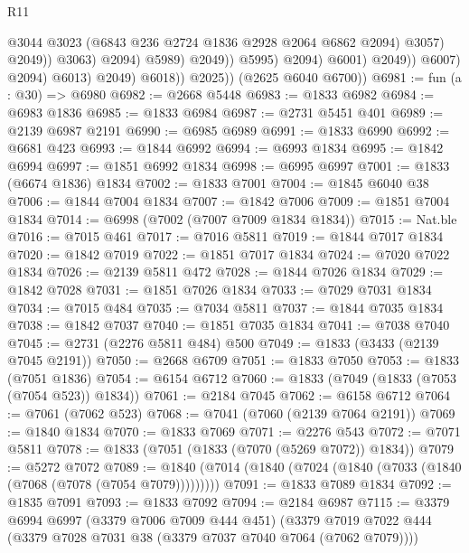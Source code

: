 \begin{lexlean}{R11}
\begin{coremodule}
                                                @3044
                                                @3023
                                                (@6843 @236 @2724 @1836 @2928 @2064 @6862 @2094)
                                                @3057)
                                              @2049))
                                          @3063)
                                        @2094)
                                      @5989)
                                    @2049))
                                @5995)
                              @2094)
                            @6001)
                          @2049))
                      @6007)
                    @2094)
                  @6013)
                @2049)
              @6018))
          @2025))
      (@2625 @6040 @6700))
@6981 := fun (a : @30) => @6980
@6982 := @2668 @5448
@6983 := @1833 @6982
@6984 := @6983 @1836
@6985 := @1833 @6984
@6987 := @2731 @5451 @401
@6989 := @2139 @6987 @2191
@6990 := @6985 @6989
@6991 := @1833 @6990
@6992 := @6681 @423
@6993 := @1844 @6992
@6994 := @6993 @1834
@6995 := @1842 @6994
@6997 := @1851 @6992 @1834
@6998 := @6995 @6997
@7001 := @1833 (@6674 @1836) @1834
@7002 := @1833 @7001
@7004 := @1845 @6040 @38
@7006 := @1844 @7004 @1834
@7007 := @1842 @7006
@7009 := @1851 @7004 @1834
@7014 := @6998 (@7002 (@7007 @7009 @1834 @1834))
@7015 := Nat.ble
@7016 := @7015 @461
@7017 := @7016 @5811
@7019 := @1844 @7017 @1834
@7020 := @1842 @7019
@7022 := @1851 @7017 @1834
@7024 := @7020 @7022 @1834
@7026 := @2139 @5811 @472
@7028 := @1844 @7026 @1834
@7029 := @1842 @7028
@7031 := @1851 @7026 @1834
@7033 := @7029 @7031 @1834
@7034 := @7015 @484
@7035 := @7034 @5811
@7037 := @1844 @7035 @1834
@7038 := @1842 @7037
@7040 := @1851 @7035 @1834
@7041 := @7038 @7040
@7045 := @2731 (@2276 @5811 @484) @500
@7049 := @1833 (@3433 (@2139 @7045 @2191))
@7050 := @2668 @6709
@7051 := @1833 @7050
@7053 := @1833 (@7051 @1836)
@7054 := @6154 @6712
@7060 := @1833 (@7049 (@1833 (@7053 (@7054 @523)) @1834))
@7061 := @2184 @7045
@7062 := @6158 @6712
@7064 := @7061 (@7062 @523)
@7068 := @7041 (@7060 (@2139 @7064 @2191))
@7069 := @1840 @1834
@7070 := @1833 @7069
@7071 := @2276 @543
@7072 := @7071 @5811
@7078 := @1833 (@7051 (@1833 (@7070 (@5269 @7072)) @1834))
@7079 := @5272 @7072
@7089 := @1840 (@7014 (@1840 (@7024 (@1840 (@7033 (@1840 (@7068 (@7078 (@7054 @7079)))))))))
@7091 := @1833 @7089 @1834
@7092 := @1835 @7091
@7093 := @1833 @7092
@7094 := @2184 @6987
@7115 := @3379
    @6994
    @6997
    (@3379 @7006 @7009 @444 @451)
    (@3379 @7019 @7022 @444 (@3379 @7028 @7031 @38 (@3379 @7037 @7040 @7064 (@7062 @7079))))

\end{coremodule}
\end{lexlean}

